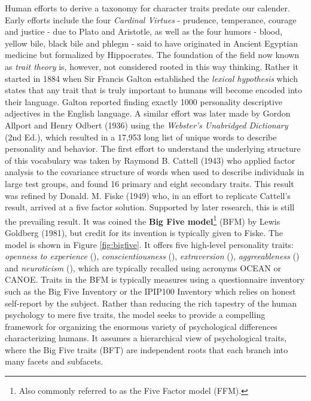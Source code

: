 Human efforts to derive a taxonomy for character traits predate our calender. Early efforts include the four \textit{Cardinal Virtues} - prudence, temperance, courage and justice - due to Plato and Aristotle, as well as the four humors - blood, yellow bile, black bile and phlegm - said to have originated in Ancient Egyptian medicine but formalized by Hippocrates.
The foundation of the field now known as \textit{trait theory} is, however, not considered rooted in this way thinking. Rather it started in 1884 when Sir Francis Galton established the \textit{lexical hypothesis} which states that any trait that is truly important to humans will become encoded into their language. Galton reported finding exactly 1000 personality descriptive adjectives in the English language. A similar effort was later made by Gordon Allport and Henry Odbert (1936) using the \textit{Webster's Unabridged Dictionary} (2nd Ed.), which resulted in a 17,953 long list of unique words to describe personality and behavior. The first effort to understand the underlying structure of this vocabulary was taken by Raymond B. Cattell (1943) who applied factor analysis to the covariance structure of words when used to describe individuals in large test groups, and found 16 primary and eight secondary traits. This result was refined by Donald. M. Fiske (1949) who, in an effort to replicate Cattell's result, arrived at a five factor solution. Supported by later research, this is still the prevailing result. It was coined the \textbf{Big Five model}\footnote{Also commonly referred to as the Five Factor model (FFM).} (BFM) by Lewis Goldberg (1981), but credit for its invention is typically given to Fiske. The model is shown in Figure \ref{fig:bigfive}. It offers five high-level personality traits: \textit{openness to experience} (\OPE), \textit{conscientiousness} (\CON), \textit{extraversion} (\EXT), \textit{aggreeableness} (\AGR) and \textit{neuroticism} (\NEU), which are typically recalled using acronyms OCEAN or CANOE. Traits in the BFM is typically measures using a questionnaire inventory such as the Big Five Inventory or the IPIP100 Inventory which relies on honest self-report by the subject. Rather than reducing the rich tapestry of the human psychology to mere five traits, the model seeks to provide a compelling framework for organizing the enormous variety of psychological differences characterizing humans. It assumes a hierarchical view of psychological traits, where the Big Five traits (BFT) are independent roots that each branch into many facets and subfacets.

